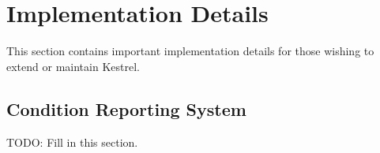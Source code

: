 
\section{Implementation Details}
\label{sec.impl}

This section contains important implementation details for those wishing to extend or maintain Kestrel.

\subsection{Condition Reporting System}
\label{sec.impl.conditions}

TODO: Fill in this section.
